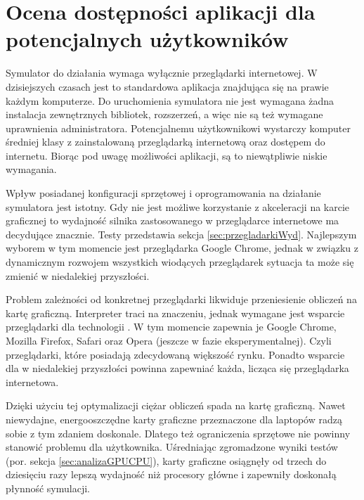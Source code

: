 \clearpage

\section{Ocena dostępności aplikacji dla potencjalnych użytkowników}

Symulator \en do działania wymaga wyłącznie przeglądarki internetowej. W
dzisiejszych czasach jest to standardowa aplikacja znajdująca się na prawie
każdym komputerze. Do uruchomienia symulatora \en nie jest wymagana żadna
instalacja zewnętrznych bibliotek, rozszerzeń, a więc nie są też wymagane
uprawnienia administratora. Potencjalnemu użytkownikowi wystarczy
komputer średniej klasy z zainstalowaną przeglądarką internetową oraz dostępem
do internetu. Biorąc pod uwagę możliwości aplikacji, są to niewątpliwie niskie
wymagania.

Wpływ posiadanej konfiguracji sprzętowej i oprogramowania na działanie
symulatora jest istotny. Gdy nie jest możliwe korzystanie z akceleracji na
karcie graficznej to wydajność silnika  zastosowanego w
przeglądarce internetowe ma decydujące znacznie. Testy przedstawia sekcja
\ref{sec:przegladarkiWyd}. Najlepszym wyborem w tym momencie jest przeglądarka
Google Chrome, jednak w związku z dynamicznym rozwojem wszystkich wiodących
przeglądarek sytuacja ta może się zmienić w niedalekiej przyszłości.

Problem zależności od konkretnej przeglądarki likwiduje przeniesienie
obliczeń na kartę graficzną. Interpreter  traci na znaczeniu,
jednak wymagane jest wsparcie przeglądarki dla technologii . W tym
momencie zapewnia je Google Chrome, Mozilla Firefox, Safari oraz Opera (jeszcze
w fazie eksperymentalnej). Czyli przeglądarki, które posiadają zdecydowaną
większość rynku. Ponadto wsparcie dla  w niedalekiej przyszłości
powinna zapewniać każda, licząca się przeglądarka internetowa.

Dzięki użyciu tej optymalizacji ciężar obliczeń spada na kartę graficzną. Nawet
niewydajne, energooszczędne karty graficzne przeznaczone dla laptopów radzą
sobie z tym zdaniem doskonale. Dlatego też ograniczenia sprzętowe nie powinny
stanowić problemu dla użytkownika. Uśredniając zgromadzone wyniki testów (por.
sekcja \ref{sec:analizaGPUCPU}), karty graficzne osiągnęły od trzech do
dziesięciu razy lepszą wydajność niż procesory główne i zapewniły doskonałą
płynność symulacji.


